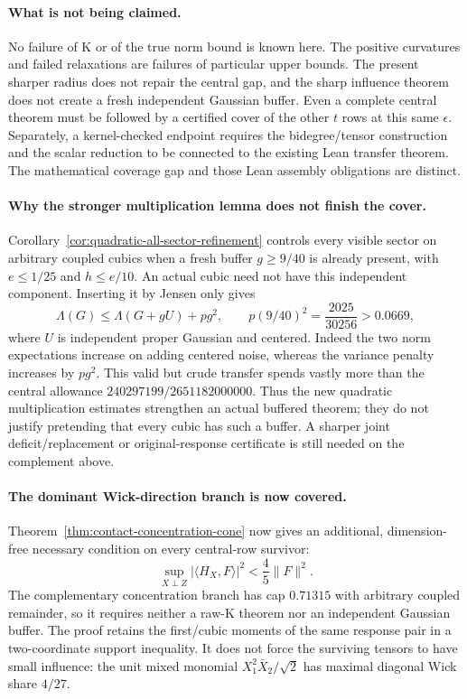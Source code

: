 \paragraph{What is not being claimed.}
No failure of K or of the true norm bound is known here. The positive
curvatures and failed relaxations are failures of particular upper
bounds. The present sharper radius does not repair the central gap,
and the sharp influence theorem does not create a fresh independent
Gaussian buffer. Even a complete central theorem must be followed by
a certified cover of the other $t$ rows at this same $\epsilon$.
Separately, a kernel-checked endpoint requires the bidegree/tensor
construction and the scalar reduction to be connected to the existing
Lean transfer theorem. The mathematical coverage gap and those Lean
assembly obligations are distinct.

\paragraph{Why the stronger multiplication lemma does not finish the cover.}
Corollary~\ref{cor:quadratic-all-sector-refinement} controls every visible
sector on arbitrary coupled cubics when a fresh buffer $g\ge9/40$ is
already present, with $e\le1/25$ and $h\le e/10$.
An actual cubic need not have this independent component.
Inserting it by Jensen only gives
\[
 \Lambda(G)\le\Lambda(G+gU)+pg^2,
 \qquad p(9/40)^2=\frac{2025}{30256}>0.0669,
\]
where $U$ is independent proper Gaussian and centered.
Indeed the two norm expectations increase on adding centered noise,
whereas the variance penalty increases by $pg^2$.
This valid but crude transfer spends vastly more than the central
allowance $240297199/2651182000000$.
Thus the new quadratic multiplication estimates strengthen an actual
buffered theorem; they do not justify pretending that every cubic has
such a buffer. A sharper joint deficit/replacement or original-response
certificate is still needed on the complement above.

\paragraph{The dominant Wick-direction branch is now covered.}
Theorem~\ref{thm:contact-concentration-cone} now gives an additional,
dimension-free necessary condition on every central-row survivor:
\[
 \sup_{X\perp Z}|\langle H_X,F\rangle|^2<\frac45\|F\|^2.
\]
The complementary concentration branch has cap $0.71315$ with arbitrary
coupled remainder, so it requires neither a raw-K theorem nor an
independent Gaussian buffer. The proof retains the first/cubic moments
of the same response pair in a two-coordinate support inequality.
It does not force the surviving tensors to have small influence: the
unit mixed monomial $X_1^2\bar X_2/\sqrt2$ has maximal diagonal Wick
share $4/27$.

